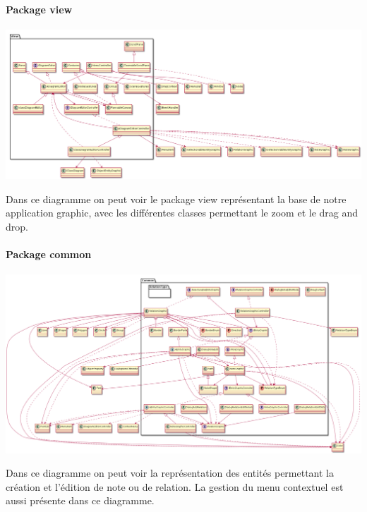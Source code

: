 \documentclass[a4paper,10pt]{article}
\begin{document}
	\paragraph{Package view }
	\begin{center}
	    \includegraphics[width=\textwidth]{DiagrammesVueVersion1erLivrable/viewsimplifie.png}
	\end{center}
	Dans ce diagramme on peut voir le package view représentant la base de notre application graphic, avec les différentes classes permettant
	le zoom et le drag and drop.
	
	\newpage
    \paragraph{Package common }
	  \begin{center}
	      \includegraphics[width=\textwidth]{DiagrammesVueVersion1erLivrable/CommonSimplifie.png}
	  \end{center}
	  Dans ce diagramme on peut voir la représentation des entités permettant la création et l'édition de note ou de relation. La gestion du menu
	  contextuel est aussi présente dans ce diagramme.
	  \newpage
\end{document}
